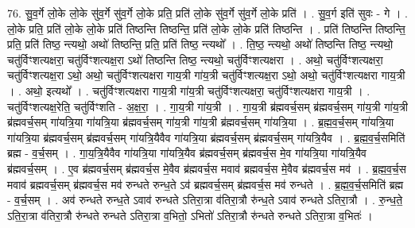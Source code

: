 \documentclass[17pt]{extarticle}
\begin{document}
76. सु॒व॒र्गे लो॒के लो॒के सु॑व॒र्गे सु॑व॒र्गे लो॒के प्रति॒ प्रति॑ लो॒के सु॑व॒र्गे सु॑व॒र्गे लो॒के प्रति॑ । . सु॒व॒र्ग इति॑ सुवः - गे । . लो॒के प्रति॒ प्रति॑ लो॒के लो॒के प्रति॑ तिष्ठन्ति तिष्ठन्ति॒ प्रति॑ लो॒के लो॒के प्रति॑ तिष्ठन्ति । . प्रति॑ तिष्ठन्ति तिष्ठन्ति॒ प्रति॒ प्रति॑ तिष्ठ॒ न्त्यथो॒ अथो॑ तिष्ठन्ति॒ प्रति॒ प्रति॑ तिष्ठ॒ न्त्यथो᳚ । . ति॒ष्ठ॒ न्त्यथो॒ अथो॑ तिष्ठन्ति तिष्ठ॒ न्त्यथो॒ चतु॑र्विꣳशत्यक्षरा॒ चतु॑र्विꣳशत्यक्ष॒रा ऽथो॑ तिष्ठन्ति तिष्ठ॒ न्त्यथो॒ चतु॑र्विꣳशत्यक्षरा । . अथो॒ चतु॑र्विꣳशत्यक्षरा॒ चतु॑र्विꣳशत्यक्ष॒रा ऽथो॒ अथो॒ चतु॑र्विꣳशत्यक्षरा गाय॒त्री गा॑य॒त्री चतु॑र्विꣳशत्यक्ष॒रा ऽथो॒ अथो॒ चतु॑र्विꣳशत्यक्षरा गाय॒त्री । . अथो॒ इत्यथो᳚ । . चतु॑र्विꣳशत्यक्षरा गाय॒त्री गा॑य॒त्री चतु॑र्विꣳशत्यक्षरा॒ चतु॑र्विꣳशत्यक्षरा गाय॒त्री । . चतु॑र्विꣳशत्यक्ष॒रेति॒ चतु॑र्विꣳशति - अ॒क्ष॒रा॒ । . गा॒य॒त्री गा॑य॒त्री । . गा॒य॒त्री ब्र॑ह्मवर्च॒सम् ब्र॑ह्मवर्च॒सम् गा॑य॒त्री गा॑य॒त्री ब्र॑ह्मवर्च॒सम् गा॑यत्रि॒या गा॑यत्रि॒या ब्र॑ह्मवर्च॒सम् गा॑य॒त्री गा॑य॒त्री ब्र॑ह्मवर्च॒सम् गा॑यत्रि॒या । . ब्र॒ह्म॒व॒र्च॒सम् गा॑यत्रि॒या गा॑यत्रि॒या ब्र॑ह्मवर्च॒सम् ब्र॑ह्मवर्च॒सम् गा॑यत्रि॒यैवैव गा॑यत्रि॒या ब्र॑ह्मवर्च॒सम् ब्र॑ह्मवर्च॒सम् गा॑यत्रि॒यैव । . ब्र॒ह्म॒व॒र्च॒समिति॑ ब्रह्म - व॒र्च॒सम् । . गा॒य॒त्रि॒यैवैव गा॑यत्रि॒या गा॑यत्रि॒यैव ब्र॑ह्मवर्च॒सम् ब्र॑ह्मवर्च॒स मे॒व गा॑यत्रि॒या गा॑यत्रि॒यैव ब्र॑ह्मवर्च॒सम् । . ए॒व ब्र॑ह्मवर्च॒सम् ब्र॑ह्मवर्च॒स मे॒वैव ब्र॑ह्मवर्च॒स मवाव॑ ब्रह्मवर्च॒स मे॒वैव ब्र॑ह्मवर्च॒स मव॑ । . ब्र॒ह्म॒व॒र्च॒स मवाव॑ ब्रह्मवर्च॒सम् ब्र॑ह्मवर्च॒स मव॑ रुन्धते रुन्ध॒ते ऽव॑ ब्रह्मवर्च॒सम् ब्र॑ह्मवर्च॒स मव॑ रुन्धते । . ब्र॒ह्म॒व॒र्च॒समिति॑ ब्रह्म - व॒र्च॒सम् । . अव॑ रुन्धते रुन्ध॒ते ऽवाव॑ रुन्धते ऽतिरा॒त्रा व॑तिरा॒त्रौ रु॑न्ध॒ते ऽवाव॑ रुन्धते ऽतिरा॒त्रौ । . रु॒न्ध॒ते॒ ऽति॒रा॒त्रा व॑तिरा॒त्रौ रु॑न्धते रुन्धते ऽतिरा॒त्रा व॒भितो॒ ऽभितो॑ ऽतिरा॒त्रौ रु॑न्धते रुन्धते ऽतिरा॒त्रा व॒भितः॑ । \newline
\end{document}
